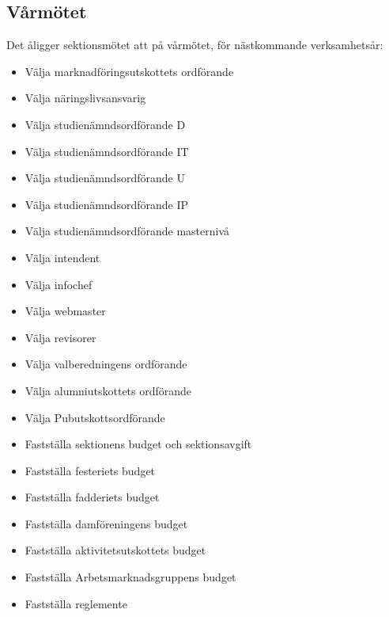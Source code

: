 \documentclass{datateknologsektionen-document}
\begin{document}
    \subsection{Vårmötet}
      Det åligger sektionsmötet att på vårmötet, för nästkommande verksamhetsår:
      \begin{itemize}
        \item Välja marknadföringsutskottets ordförande
        \item Välja näringslivsansvarig
        \item Välja studienämndsordförande D
        \item Välja studienämndsordförande IT
        \item Välja studienämndsordförande U
        \item Välja studienämndsordförande IP
        \item Välja studienämndsordförande masternivå
        \item Välja intendent
	\item Välja infochef
	\item Välja webmaster
        \item Välja revisorer
        \item Välja valberedningens ordförande
        \item Välja alumniutskottets ordförande
        \item Välja Pubutskottsordförande
        \item Fastställa sektionens budget och sektionsavgift
        \item Fastställa festeriets budget
        \item Fastställa fadderiets budget
        \item Fastställa damföreningens budget
        \item Fastställa aktivitetsutskottets budget
        \item Fastställa Arbetsmarknadsgruppens budget
        \item Fastställa reglemente
      \end{itemize}
\end{document}
